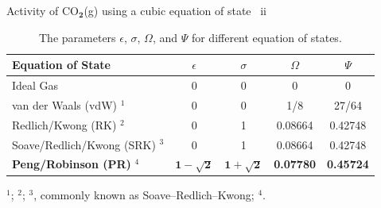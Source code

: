 %
%
%
%
%
\begin{frame}{Activity of CO$_{\boldsymbol{2}}$(g) using a cubic equation of state \, ii}

\begin{table}
\begin{tabular*}{1\textwidth}{@{\extracolsep{\fill}}lcccc}
\toprule 
Equation of State & $\epsilon$ & $\sigma$ & $\Omega$ & $\Psi$\tabularnewline
\midrule 
Ideal Gas & 0 & 0 & 0 & 0\tabularnewline
van der Waals (vdW) $^{1}$ \citeyearpar{VanderWaals1873} & 0 & 0 & 1/8 & 27/64\tabularnewline
Redlich/Kwong (RK) $^{2}$ \citeyearpar{Redlich1949} & 0 & 1 & 0.08664 & 0.42748\tabularnewline
Soave/Redlich/Kwong (SRK) $^{3}$ \citeyearpar{Soave1972} & 0 & 1 & 0.08664 & 0.42748\tabularnewline
\textbf{Peng/Robinson (PR)} $^{4}$ \citeyearpar{Peng1976} & $\mathbf{1-\sqrt{2}}$ & $\mathbf{1+\sqrt{2}}$ & \textbf{0.07780} & \textbf{0.45724} \tabularnewline
\bottomrule
\end{tabular*}

\footnotesize

$^{1}$\citet{VanderWaals1873}; 
$^{2}$\citet{Redlich1949};
$^{3}$\citet{Soave1972}, commonly known as Soave--Redlich--Kwong;
$^{4}$\citet{Peng1976}.

\caption{\normalsize The parameters $\epsilon$, $\sigma$, $\Omega$, and $\Psi$ for different
equation of states.}
\end{table}

\end{frame}
